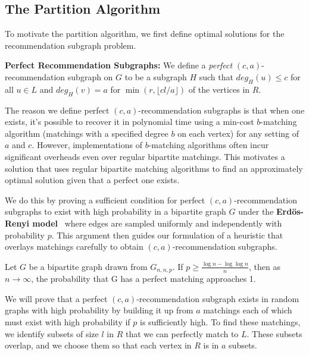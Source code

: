 \subsection{The Partition Algorithm}
To motivate the partition algorithm, we first define optimal solutions for the recommendation subgraph problem.
\vs

{\bf Perfect Recommendation Subgraphs:} We define a \emph{perfect} $(c,a)$-recommendation subgraph on $G$ to be a subgraph $H$ such that
$deg_H(u)\leq c$ for all $u\in L$ and $deg_H(v)=a$ for
$\min(r,\lfloor cl/a \rfloor)$ of the vertices in $R$.
\vs

The reason we define perfect $(c,a)$-recommendation subgraphs is that when one
exists, it's possible to recover it in polynomial time using a min-cost
$b$-matching algorithm (matchings with a specified degree $b$ on each vertex)
for any setting of $a$ and $c$. However, implementations of $b$-matching
algorithms often incur significant overheads even over regular bipartite matchings.
This motivates a solution that uses regular bipartite matching algorithms to find
an approximately optimal solution given that a perfect one exists. \vs

We do this by proving a sufficient condition for perfect $(c,a)$-recommendation
subgraphs to exist with high probability in a bipartite graph $G$ under the
{\bf Erd\"os-Renyi model}~\cite{ErdosRenyi59} where edges are sampled uniformly and
independently with probability $p$. This argument then guides our formulation of
a heuristic that overlays matchings carefully to obtain $(c,a)$-recommendation
subgraphs. \vs

\begin{thm}\cite{Janson2011}
\label{random_matching_threshold}
Let $G$ be a bipartite graph drawn from $G_{n, n, p}$. If $p \geq \frac{\log n -
\log\log n}{n}$, then as $n\to\infty$,  the probability that G has a perfect
    matching approaches 1.
\end{thm}

We will prove that a perfect $(c,a)$-recommendation subgraph exists in
random graphs with high probability by building it up from $a$
matchings each of which must exist with high probability if $p$ is
sufficiently high. To find these matchings, we identify subsets of size
$l$ in $R$ that we can perfectly match to $L$. These subsets overlap,
and we choose them so that each vertex in $R$ is in $a$ subsets.

